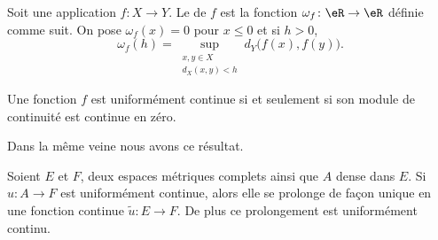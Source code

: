 \begin{definition}
    Soit une application \( f\colon X\to Y\). Le  de \( f\) est la fonction \( \omega_f\colon \eR\to \eR\) définie comme suit. On pose \( \omega_f(x)=0\) pour \( x\leq 0\) et si \( h>0\),
    \begin{equation}
        \omega_f(h)=\sup_{\substack{x,y\in X\\d_X(x,y)<h}} d_Y\big( f(x),f(y) \big).
    \end{equation}
\end{definition}

\begin{lemma}   \label{LemeERapq}
    Une fonction \( f\) est uniformément continue si et seulement si son module de continuité est continue en zéro.
\end{lemma}

Dans la même veine nous avons ce résultat.
\begin{theorem}      \label{ThoPVFQMi}
    Soient \( E\) et \( F\), deux espaces métriques complets ainsi que \( A\) dense dans \( E\). Si \( u\colon A\to F\) est uniformément continue, alors elle se prolonge de façon unique en une fonction continue \( \tilde u\colon E\to F\). De plus ce prolongement est uniformément continu.
\end{theorem}

